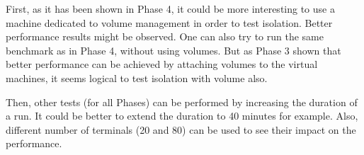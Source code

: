 First, as it has been shown in Phase 4, it could be more interesting to use a machine dedicated to volume management in order to test isolation.
Better performance results might be observed.
One can also try to run the same benchmark as in Phase 4, without using volumes.
But as Phase 3 shown that better performance can be achieved by attaching volumes to the virtual machines, it seems logical to test isolation with volume also.

Then, other tests (for all Phases) can be performed by increasing the duration of a run. 
It could be better to extend the duration to 40 minutes for example.
Also, different number of terminals (20 and 80) can be used to see their impact on the performance.






